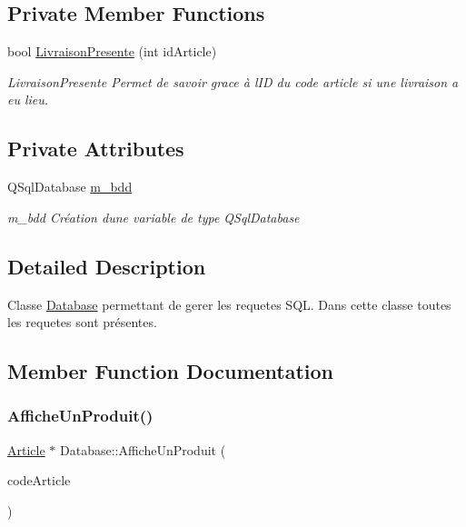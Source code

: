 \subsection*{Private Member Functions}
\begin{DoxyCompactItemize}
\item 
bool \mbox{\hyperlink{class_database_a3ff850cad75331fdaa5a98f1e656b58e}{Livraison\+Presente}} (int id\+Article)
\begin{DoxyCompactList}\small\item\em Livraison\+Presente Permet de savoir grace à l\textquotesingle{}ID du code article si une livraison a eu lieu. \end{DoxyCompactList}\end{DoxyCompactItemize}
\subsection*{Private Attributes}
\begin{DoxyCompactItemize}
\item 
\mbox{\label{class_database_a7c3d2034eb6e6dd37349ed7d7fe9bd85}} 
Q\+Sql\+Database \mbox{\hyperlink{class_database_a7c3d2034eb6e6dd37349ed7d7fe9bd85}{m\+\_\+bdd}}
\begin{DoxyCompactList}\small\item\em m\+\_\+bdd Création d\textquotesingle{}une variable de type Q\+Sql\+Database \end{DoxyCompactList}\end{DoxyCompactItemize}


\subsection{Detailed Description}
Classe \mbox{\hyperlink{class_database}{Database}} permettant de gerer les requetes S\+QL. Dans cette classe toutes les requetes sont présentes. 

\subsection{Member Function Documentation}
\mbox{\label{class_database_a925707cc35daef56c5d0009c352325fb}} 
\subsubsection{\texorpdfstring{Affiche\+Un\+Produit()}{AfficheUnProduit()}}
{\footnotesize\ttfamily \mbox{\hyperlink{class_article}{Article}} $\ast$ Database\+::\+Affiche\+Un\+Produit (\begin{DoxyParamCaption}\item[{Q\+String}]{code\+Article }\end{DoxyParamCaption})}



